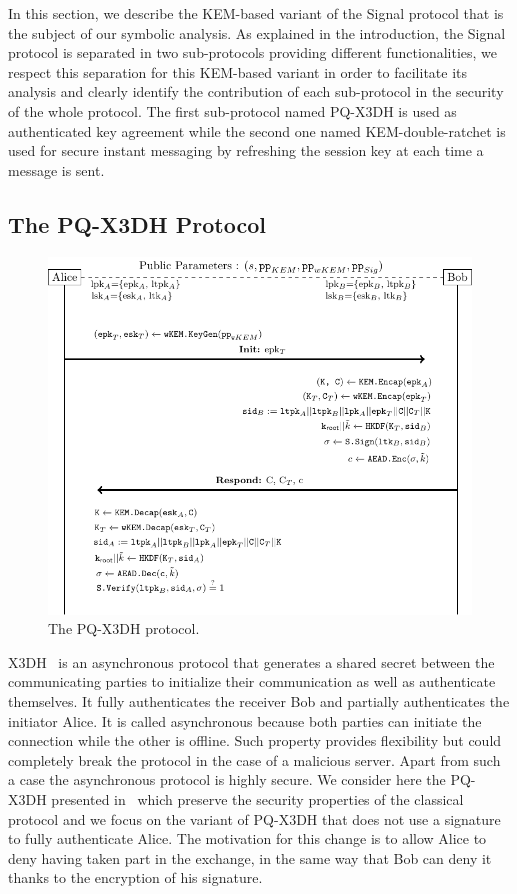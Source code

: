 In this section, we describe the KEM-based variant of the Signal protocol that is the subject of our symbolic analysis. As explained in the introduction, the Signal protocol is separated in two sub-protocols providing different functionalities, we respect this separation for this KEM-based variant in order to facilitate its analysis and clearly identify the contribution of each sub-protocol in the security of the whole protocol. The first sub-protocol named PQ-X3DH is used as authenticated key agreement while the second one named KEM-double-ratchet is used for secure instant messaging by refreshing the session key at each time a message is sent.

\subsection{The PQ-X3DH Protocol}

\begin{figure}[ht!]
\centering
\includegraphics[width=\textwidth]{KEM_X3DH_only_sign}    
\caption{The PQ-X3DH protocol.}
\label{X3DH}
\end{figure}

X3DH~\cite{X3DH} is an asynchronous protocol that generates a shared secret between the communicating parties to initialize their communication as well as authenticate themselves. It fully authenticates the receiver Bob and partially authenticates the initiator Alice. It is called asynchronous because both parties can initiate the connection while the other is offline. Such property provides flexibility but could completely break the protocol in the case of a malicious server. Apart from such a case the asynchronous protocol is highly secure. We consider here the PQ-X3DH presented in~\cite{DBLP:conf/pkc/HashimotoKKP21} which preserve the security properties of the classical protocol and we focus on the variant of PQ-X3DH that does not use a signature to fully authenticate Alice. The motivation for this change is to allow Alice to deny having taken part in the exchange, in the same way that Bob can deny it thanks to the encryption of his signature.

